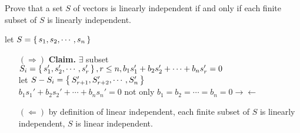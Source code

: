 Prove that a set $S$ of vectors is linearly independent if and only if each finite subset of $S$ is linearly independent.

\begin{tcolorbox}
	\begin{solution}
		let $S = \left\{ \,s_1,s_2,\cdots,s_n \,\right\}$\\
		\begin{enumerate}
			\item[$(\Rightarrow)$] \textbf{Claim.} $\exists$ subset $S_i = \left\{ \,s_1',s_2',\cdots,s_r' \,\right\}, r \leq n, b_1s_1'+b_2s_2'+\cdots + b_ns_r' = 0$\\
			let $S-S_i = \left\{ \,S_{r+1}',S_{r+2}',\cdots,S_{n}' \,\right\}$\\
			$b_1s_1'+b_2s_2'+\cdots+b_ns_n' = 0$ not only $b_1 = b_2 = \cdots = b_n = 0  \rightarrow\leftarrow$
			
			\item[$(\Leftarrow)$] by definition of linear independent, each finite subset of $S$ is linearly independent, $S$ is linear independent.
		\end{enumerate}
	\end{solution}
\end{tcolorbox}